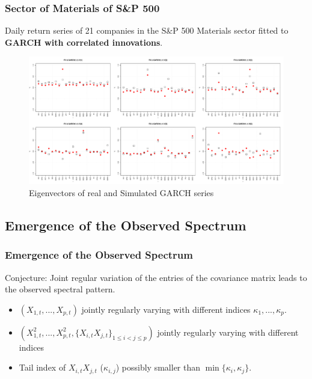 \documentclass{beamer}
\begin{document}
\begin{frame}
  \frametitle{Sector of Materials of S\&P 500}
  Daily return series of 21 companies in the S\&P 500 Materials sector
  fitted to {\bf GARCH with correlated innovations}.
  \begin{figure}[htb!]
    \centering
    \includegraphics[width=1.0\linewidth]{Materials_eigenvectors1.pdf}
    \caption{\scriptsize Eigenvectors of real and Simulated GARCH series}
  \end{figure}
\end{frame}

\subsection{Emergence of the Observed Spectrum}
\begin{frame}
  \frametitle{Emergence of the Observed Spectrum}
  Conjecture: Joint regular variation of the entries of the covariance
  matrix leads to the observed spectral pattern.
  \begin{itemize}
  \item $(X_{1,t}, ..., X_{p,t})$ jointly regularly varying with
    different indices $\kappa_1, ..., \kappa_p$.
  \item $(X_{1,t}^2, ..., X_{p,t}^2, \{X_{i,t}X_{j,t}\}_{1 \leq i < j
      \leq p})$ jointly regularly varying with different indices
  \item Tail index of $X_{i,t} X_{j,t}$ ($\kappa_{i,j}$) possibly
    smaller than $\min\{\kappa_i, \kappa_j\}$.
  \end{itemize}
\end{frame}
\end{document}
